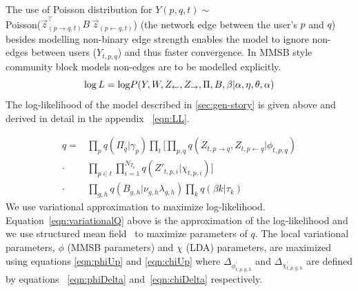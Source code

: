 \documentclass{sig-alternate}
\begin{document}
The use of Poisson distribution for $Y(p,q,t) \sim$ \\
    Poisson(${\overset{\rightarrow}{z}}^{\top}_{(p
\rightarrow q,t)} B~\overset{\rightarrow}{z}_{(p \leftarrow q,t)}$) (the 
network edge between the user's $p$ and $q$) besides modelling non-binary edge
strength enables the model to ignore non-edges between users ($Y_{t,p,q}$) and
thus faster convergence. In MMSB style community block models non-edges are to be modelled
explicitly.
\begin{equation}
\log L = \log \! P(Y, W, Z_{\leftarrow}, 
Z_{\rightarrow}, \Pi, B, \beta | \alpha, \eta, \theta, \alpha) \\
\end{equation}
The log-likelihood of the model described in \ref{sec:gen-story} is given
 above and derived in detail in the appendix ~\ref{eqn:LL}.

\begin{align}
q = &\prod_{p}q(\Pi_{q} | \gamma_{p}) \prod_{t} \bigg[ \prod_{p, q} \! 
q(Z_{t, p \rightarrow q}, Z_{t, p \leftarrow q} | \phi_{t,p,q})  \nonumber\\ 
\cdot &\prod_{p \in t} \prod_{i=1}^{N_{T_{p}}} q(Z'_{t,p,i} | \chi_{t,p,i})
\bigg] \nonumber \\
\cdot & \prod_{g,h} q(B_{g,h} | \nu_{g,h} \lambda_{g,h}) \prod_{k} q(\beta{k} | \tau_{k})
\label{eqn:variationalQ}
\end{align}
We use variational approximation to maximize log-likelihood.
Equation~\ref{eqn:variationalQ} above is the approximation of the log-likelihood and we
use structured mean field~\cite{Xing_et_al:2003} to maximize parameters of $q$.
The local variational parameters, $\phi$ (MMSB parameters) and $\chi$ (LDA)
parameters, are maximized using equations \ref{eqn:phiUp} and \ref{eqn:chiUp}
where $\Delta_{\phi^{'}_{t,p,g,h}}$ and $\Delta_{\chi^{'}_{t,p,g,h}}$ are
defined by equations ~\ref{eqn:phiDelta} and~\ref{eqn:chiDelta} respectively.
\end{document}
